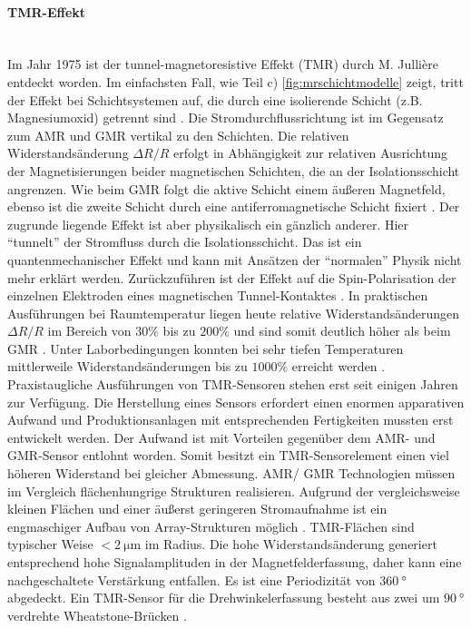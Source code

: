 \paragraph{TMR-Effekt}\label{par:TMR}$~$\\


Im Jahr 1975 ist der tunnel-magnetoresistive Effekt (TMR) durch M. Jullière entdeckt worden. Im einfachsten Fall, wie Teil c) \autoref{fig:mrschichtmodelle} zeigt, tritt der Effekt bei Schichtsystemen auf, die durch eine isolierende Schicht (z.B. Magnesiumoxid) getrennt sind \cite{Lemme2016}. Die Stromdurchflussrichtung ist im Gegensatz zum AMR und GMR vertikal zu den Schichten. Die relativen Widerstandsänderung $\Delta R/R$ erfolgt in Abhängigkeit zur relativen Ausrichtung der Magnetisierungen beider magnetischen Schichten, die an der Isolationsschicht angrenzen.
\newline
Wie beim GMR folgt die aktive Schicht einem äußeren Magnetfeld, ebenso ist die zweite Schicht durch eine antiferromagnetische Schicht fixiert  \cite{Tille2020}. Der zugrunde liegende Effekt ist aber physikalisch ein gänzlich anderer. Hier ``tunnelt'' der Stromfluss durch die Isolationsschicht. Das ist ein quantenmechanischer Effekt und kann mit Ansätzen der ``normalen'' Physik nicht mehr erklärt werden. Zurückzuführen ist der Effekt auf die Spin-Polarisation der einzelnen Elektroden eines magnetischen Tunnel-Kontaktes \cite{Tille2020}.
\newline
In praktischen Ausführungen bei Raumtemperatur liegen heute relative Widerstandsänderungen $\Delta R/R$ im Bereich von $30\%$ bis zu $200\%$ und sind somit deutlich höher als beim GMR \cite{Tille2020}. Unter Laborbedingungen konnten bei sehr tiefen Temperaturen mittlerweile Widerstandsänderungen bis zu $1000\%$ erreicht werden \cite{Lemme2016}.
\newline
Praxistaugliche Ausführungen von TMR-Sensoren stehen erst seit einigen Jahren zur Verfügung. Die Herstellung eines Sensors erfordert einen enormen apparativen Aufwand und Produktionsanlagen mit entsprechenden Fertigkeiten mussten erst entwickelt werden. Der Aufwand ist mit Vorteilen gegenüber dem AMR- und GMR-Sensor entlohnt worden.
Somit besitzt ein TMR-Sensorelement einen viel höheren Widerstand bei gleicher Abmessung. AMR/ GMR Technologien müssen im Vergleich flächenhungrige Strukturen realisieren. Aufgrund der vergleichsweise kleinen Flächen und einer äußerst geringeren Stromaufnahme ist ein engmaschiger Aufbau von Array-Strukturen möglich \cite{Lemme2016}. TMR-Flächen sind typischer Weise $< \SI{2}{\micro\metre}$ im  Radius. Die hohe Widerstandsänderung generiert entsprechend hohe Signalamplituden in der Magnetfelderfassung, daher kann eine nachgeschaltete Verstärkung entfallen. Es ist eine Periodizität von $\SI{360}{\degree}$ abgedeckt. Ein TMR-Sensor für die Drehwinkelerfassung besteht aus zwei um $\SI{90}{\degree}$ verdrehte Wheatstone-Brücken \cite{TDK2016}.


